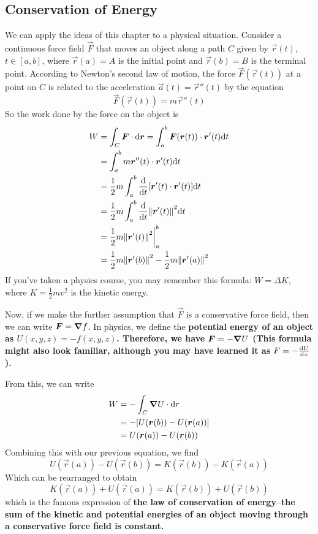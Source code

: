 \subsection{Conservation of Energy}
We can apply the ideas of this chapter to a physical situation. Consider a continuous force field $\vec F$ that moves an object along a path $C$ given by $\vec r(t)$, $t\in[a,b]$, where $\vec r(a)=A$ is the initial point and $\vec r(b) = B$ is the terminal point. According to Newton's second law of motion, the force $\vec F(\vec r(t))$ at a point on $C$ is related to the acceleration $\vec a(t) = \vec r''(t)$ by the equation
\[ \vec F(\vec r(t)) = m\vec r''(t) \]
So the work done by the force on the object is
\begin{align*}
    W &= \int_C \vec F\cdot \dd \vec r = \int_a^b \vec F(\vec r(t))\cdot \vec r'(t)\dd t \\
    &= \int_a^b m\vec r''(t)\cdot \vec r'(t)\dd t \\
    &= \frac{1}{2}m\int_a^b \dv{t}\bqty{\vec r'(t)\cdot \vec r'(t)}\dd t \\
    &= \frac{1}{2}m\int_a^b\dv{t}\norm{\vec r'(t)}^2\dd t \\
    &= \frac{1}{2}m\norm{\vec r'(t)}^2\biggr|_a^b \\
    &= \frac{1}{2}m\norm{\vec r'(b)}^2 - \frac{1}{2}m\norm{\vec r'(a)}^2
\end{align*}
If you've taken a physics course, you may remember this formula: $W = \Delta K$, where $K = \frac{1}{2}mv^2$ is the kinetic energy. \par
Now, if we make the further assumption that $\vec F$ is a conservative force field, then we can write $\boldsymbol{F} = \boldsymbol\nabla f$. In physics, we define the \bf{potential energy} of an object as $U(x,y,z) = -f(x,y,z)$. Therefore, we have $\boldsymbol{F} = -\boldsymbol\nabla U$ (This formula might also look familiar, although you may have learned it as $F = -\dv{U}{x}$). \par
From this, we can write
\begin{align*}
    W &= -\int_C \boldsymbol\nabla U\cdot \dd r \\
    &= -[U(\boldsymbol{r}(b)) - U(\boldsymbol{r}(a))] \\
    &= U(\boldsymbol{r}(a)) - U(\boldsymbol{r}(b))
\end{align*}
Combining this with our previous equation, we find
\[ U(\vec r(a))-U(\vec r(b)) = K(\vec r(b)) - K(\vec r(a))\]
Which can be rearranged to obtain
\[K(\vec r(a)) + U(\vec r(a)) = K(\vec r(b)) + U(\vec r(b))\]
which is the famous expression of \bf{the law of conservation of energy}--the sum of the kinetic and potential energies of an object moving through a conservative force field is constant.

